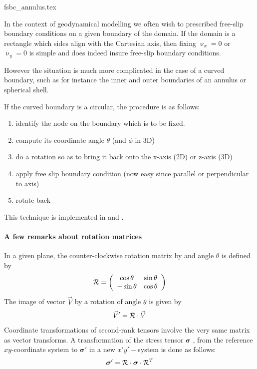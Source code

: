 \begin{flushright} {\tiny {\color{gray} fsbc\_annulus.tex}} \end{flushright}

In the context of geodynamical modelling we often wish to prescribed free-slip 
boundary conditions on a given boundary of the domain. If the domain is a rectangle
which sides align with the Cartesian axis, then fixing $\upnu_x=0$ or $\upnu_y=0$
is simple and does indeed insure free-slip boundary conditions. 

However the situation is much more complicated in the case of a curved boundary, 
such as for instance the inner and outer boundaries of an annulus or spherical shell.

If the curved boundary is a circular, the procedure is as follows:
\begin{enumerate}
\item identify the node on the boundary which is to be fixed. 
\item compute its coordinate angle $\theta$ (and $\phi$ in 3D) 
\item do a rotation so as to bring it back onto the x-axis (2D) or z-axis (3D)
\item apply free slip boundary condition (now easy since parallel or perpendicular to axis)
\item rotate back
\end{enumerate}

This technique is implemented in  and .

\paragraph{A few remarks about rotation matrices} 
In a given plane, the counter-clockwise rotation matrix by and angle $\theta$ is defined by 
\[
{\cal R}=
\left(
\begin{array}{cc}
\cos\theta & \sin\theta \\
-\sin\theta & \cos\theta
\end{array}
\right)
\]
The image of vector $\vec{V}$ by a rotation of angle $\theta$ is given by
\[
\vec{V}'={\cal R}\cdot \vec{V}
\]

Coordinate transformations of second-rank tensors involve the very same   
matrix as vector transforms. A transformation of the stress tensor ${\bm \sigma}$ ,
from the reference $xy$-coordinate system to ${\bm \sigma}'$ in a new $x'y'-$system is done as follows:
\[
{\bm \sigma}'={\cal R}\cdot {\bm \sigma}\cdot{\cal R}^T
\]



